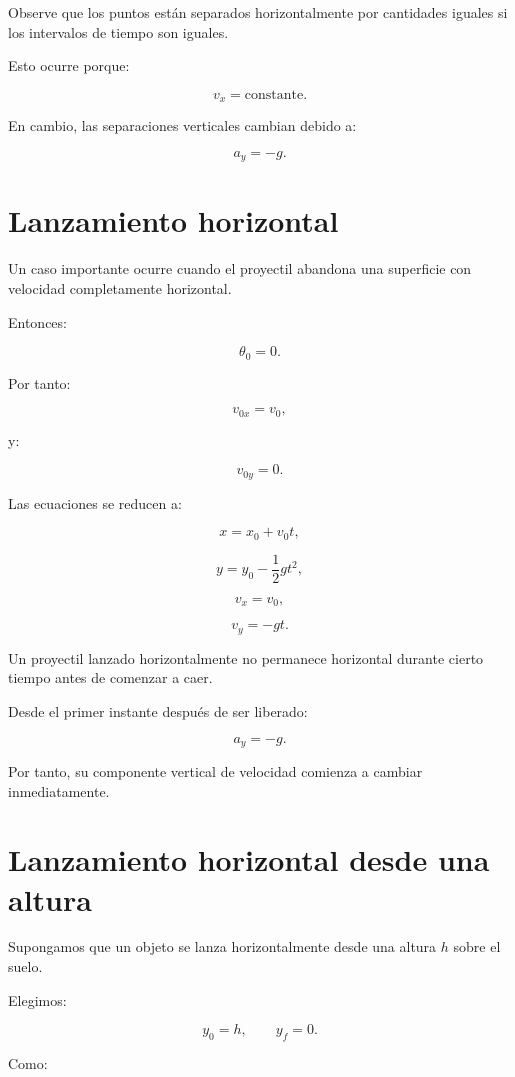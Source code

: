 Observe que los puntos están separados horizontalmente por cantidades iguales si
los intervalos de tiempo son iguales.

Esto ocurre porque:

\[
v_x=\text{constante}.
\]

En cambio, las separaciones verticales cambian debido a:

\[
a_y=-g.
\]


\section{Lanzamiento horizontal}

Un caso importante ocurre cuando el proyectil abandona una superficie con
velocidad completamente horizontal.

Entonces:

\[
\theta_0=0.
\]

Por tanto:

\[
v_{0x}=v_0,
\]

y:

\[
v_{0y}=0.
\]

Las ecuaciones se reducen a:

\[
\boxed{
x=x_0+v_0t
},
\]

\[
\boxed{
y=y_0-\frac{1}{2}gt^2
},
\]

\[
\boxed{
v_x=v_0
},
\]

\[
\boxed{
v_y=-gt
}.
\]

\begin{idea}
Un proyectil lanzado horizontalmente no permanece horizontal durante cierto
tiempo antes de comenzar a caer.

Desde el primer instante después de ser liberado:

\[
a_y=-g.
\]

Por tanto, su componente vertical de velocidad comienza a cambiar
inmediatamente.
\end{idea}


\section{Lanzamiento horizontal desde una altura}

Supongamos que un objeto se lanza horizontalmente desde una altura \(h\) sobre
el suelo.

Elegimos:

\[
y_0=h,
\qquad
y_f=0.
\]

Como:

